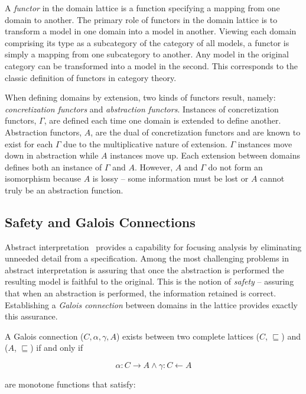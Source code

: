 \documentclass[12pt]{article}
\begin{document}
A \emph{functor} in the domain lattice is a function specifying a mapping from one domain
to another.  The primary role of functors in the domain lattice is to transform a model in
one domain into a model in another.  Viewing each domain comprising its type as a
subcategory of the category of all models, a functor is simply a mapping from one
subcategory to another.  Any model in the original category can be transformed into a
model in the second.  This corresponds to the classic definition of functors in category
theory.

When defining domains by extension, two kinds of functors result, namely:
\emph{concretization functors} and \emph{abstraction functors}.  Instances of
concretization functors, $\Gamma$, are defined each time one domain is extended to define
another.  Abstraction functors, $A$, are the dual of concretization functors and are known
to exist for each $\Gamma$ due to the multiplicative nature of extension.  $\Gamma$
instances move down in abstraction while $A$ instances move up.  Each extension between
domains defines both an instance of $\Gamma$ and $A$.  However, $A$ and $\Gamma$ do not
form an isomorphism because $A$ is lossy -- some information must be lost or $A$ cannot
truly be an abstraction function.

\subsection{Safety and Galois Connections}

Abstract interpretation~\cite{Cousot:00:Abstract-Interp} provides a capability for
focusing analysis by eliminating unneeded detail from a specification.  Among the most
challenging problems in abstract interpretation is assuring that once the abstraction is
performed the resulting model is faithful to the original.  This is the notion of
\emph{safety} -- assuring that when an abstraction is performed, the information retained
is correct.  Establishing a \emph{Galois connection} \cite{Nielson:05:Principles-of-P}
between domains in the lattice provides exactly this assurance.

A Galois connection ($C,\alpha,\gamma,A$) exists between two complete lattices ($C$,
$\sqsubseteq$) and ($A$, $\sqsubseteq$) if and only if

\vspace{-\bigskipamount}
\[\alpha:C \rightarrow A \wedge \gamma:C \leftarrow A\]

\noindent are monotone functions that satisfy:
\end{document}
